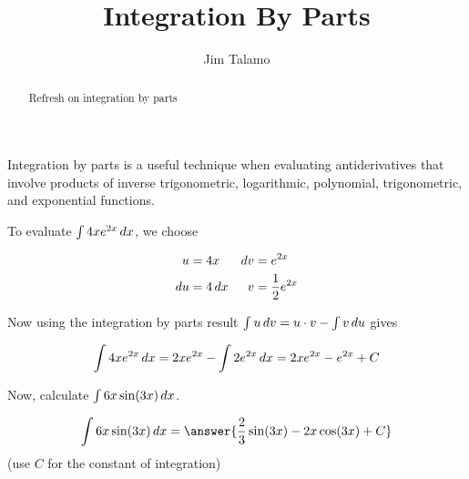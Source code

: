 \documentclass{ximera}
\title[Refresh:]{Integration By Parts}
\author{Jim Talamo}
\begin{document}
\begin{abstract}
 Refresh on integration by parts
\end{abstract}
\maketitle


\begin{exercise}

Integration by parts is a useful technique when evaluating antiderivatives that involve products of inverse trigonometric, logarithmic, polynomial, trigonometric, and exponential functions.  

\begin{example}
To evaluate $\int 4xe^{2x} \mathop{}\!d x$, we choose

\begin{align*}
u&= 4x & \mathop{}\!d v&=e^{2x} \\
\mathop{}\!d u &= 4 \mathop{}\!d x & v &=\frac{1}{2} e^{2x} \\
\end{align*}

Now using the integration by parts result $\int u \mathop{}\!d v = u \cdot v - \int v \mathop{}\!d u$ gives

\[
\int 4xe^{2x} \mathop{}\!d x = 2x e^{2x} - \int 2 e^{2x} \mathop{}\!d x = 2x e^{2x} -  e^{2x} +C
\]
\end{example}

Now, calculate $\int 6x \sin(3x) \mathop{}\!d x$.

\[
\int 6x \sin(3x) \d x= \answer{\frac{2}{3} \sin(3x)-2x\cos(3x)+C}
\] 
(use $C$ for the constant of integration)

\end{exercise}
\end{document}
